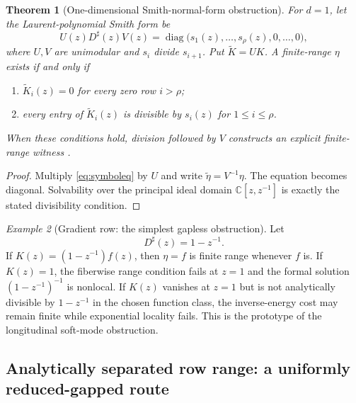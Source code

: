 \documentclass[11pt]{article}
\newtheorem{theorem}{Theorem}[section]
\theoremstyle{definition}
\theoremstyle{remark}
\newtheorem{example}[theorem]{Example}
\begin{document}
\begin{theorem}[One-dimensional Smith-normal-form obstruction]
\label{thm:smith}
For $d=1$, let the Laurent-polynomial Smith form be
\begin{equation}
 U(z)D^\sharp(z)V(z)
 =\operatorname{diag}\bigl(s_1(z),\ldots,s_\rho(z),0,\ldots,0\bigr),
 \label{eq:smith}
\end{equation}
where $U,V$ are unimodular and $s_i$ divide $s_{i+1}$.  Put $\widetilde K=UK$.  A finite-range $\eta$ exists if and only if
\begin{enumerate}[label=\textup{(\alph*)}]
\item $\widetilde K_i(z)=0$ for every zero row $i>\rho$;
\item every entry of $\widetilde K_i(z)$ is divisible by $s_i(z)$ for $1\le i\le\rho$.
\end{enumerate}
When these conditions hold, division followed by $V$ constructs an explicit finite-range witness \cite{Kailath}.
\end{theorem}

\begin{proof}
Multiply \eqref{eq:symboleq} by $U$ and write $\widetilde\eta=V^{-1}\eta$.  The equation becomes diagonal.  Solvability over the principal ideal domain $\mathbb C[z,z^{-1}]$ is exactly the stated divisibility condition.
\end{proof}

\begin{example}[Gradient row: the simplest gapless obstruction]
Let
\[
 D^\sharp(z)=1-z^{-1}.
\]
If $K(z)=(1-z^{-1})f(z)$, then $\eta=f$ is finite range whenever $f$ is.  If $K(z)=1$, the fiberwise range condition fails at $z=1$ and the formal solution $(1-z^{-1})^{-1}$ is nonlocal.  If $K(z)$ vanishes at $z=1$ but is not analytically divisible by $1-z^{-1}$ in the chosen function class, the inverse-energy cost may remain finite while exponential locality fails.  This is the prototype of the longitudinal soft-mode obstruction.
\end{example}

\subsection{Analytically separated row range: a uniformly reduced-gapped route}
\end{document}
